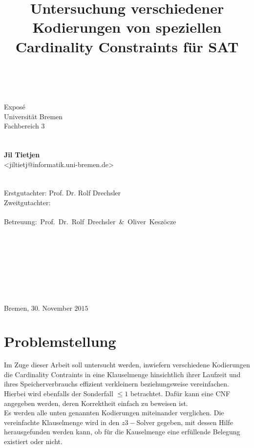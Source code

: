 \documentclass[a4,abstract=on]{scrartcl}
\title{Untersuchung verschiedener Kodierungen von speziellen Cardinality Constraints für SAT}
\date{~}
\begin{document}
	\maketitle
\thispagestyle{empty}
\begin{center}
\begin{Large}
Exposé\\Universität Bremen\\Fachbereich $3$\\
~\\~\\
\textbf{Jil Tietjen}\\<jiltietj@informatik.uni-bremen.de>\\
~\\~\\
Erstgutachter: Prof. Dr. Rolf Drechsler\\
Zweitgutachter: \\~\\
\mbox{Betreuung: Prof. Dr. Rolf Drechsler \&~Oliver Keszöcze}\\~\\~\\~\\~\\~\\~\\~\\~\\
Bremen, $30$. November $2015$
\end{Large}
\end{center}



	\tableofcontents
	\clearpage

\section{Problemstellung}
Im Zuge dieser Arbeit soll untersucht werden, inwiefern verschiedene Kodierungen die Cardinality Contraints in eine Klauselmenge hinsichtlich ihrer Laufzeit und ihres Speicherverbrauchs effizient verkleinern beziehungsweise vereinfachen. Hierbei wird ebenfalls der Sonderfall $\leq 1$ betrachtet. Dafür kann eine CNF angegeben werden, deren Korrektheit einfach zu beweisen ist. \\
Es werden alle unten genannten Kodierungen miteinander verglichen. Die vereinfachte Klauselmenge wird in den $z3-$Solver gegeben, mit dessen Hilfe herausgefunden werden kann, ob für die Kauselmenge eine erfüllende Belegung existiert oder nicht.\\
\end{document}
